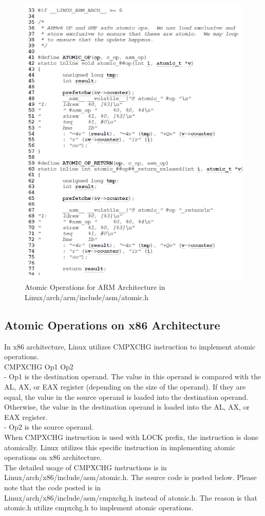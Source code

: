 \documentclass[10pt]{sigplanconf}
\begin{document}
\begin{figure}[h!]
  \centering
  \includegraphics[scale=0.4]{ARM_atomic.png}
  \caption{Atomic Operations for ARM Architecture in Linux/arch/arm/include/asm/atomic.h}
  \label{fig:ec}
\end{figure}

\subsection{Atomic Operations on x86 Architecture}
In x86 architecture, Linux utilizes CMPXCHG instruction to implement atomic operations.\\ 
CMPXCHG Op1 Op2\\
- Op1 is the destination operand. The value in this operand is compared with the AL, AX, or EAX register (depending on the size of the operand). If they are equal, the value in the source operand is loaded into the destination operand. Otherwise, the value in the destination operand is loaded into the AL, AX, or EAX register.\\
- Op2 is the source operand.\\
When CMPXCHG instruction is used with LOCK prefix, the instruction is done atomically. Linux utilizes this specific instruction in implementing atomic operations on x86 architecture.\\
The detailed usage of CMPXCHG instructions is in Linux/arch/x86/include/asm/atomic.h. The source code is posted below. Please note that the code posted is in \\Linux/arch/x86/include/asm/cmpxchg.h instead of atomic.h. The reason is that atomic.h utilize cmpxchg.h to implement atomic operations.\\
\end{document}

